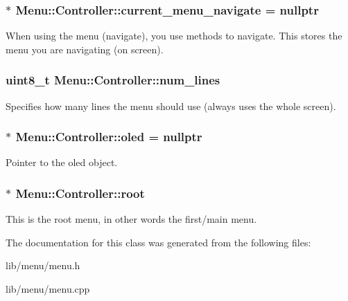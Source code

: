 \subsubsection[{\texorpdfstring{current\+\_\+menu\+\_\+navigate}{current_menu_navigate}}]{$\ast$ Menu\+::\+Controller\+::current\+\_\+menu\+\_\+navigate = nullptr\hspace{0.3cm}{\ttfamily [private]}}\hypertarget{class_menu_1_1_controller_a66ffabf19a4423ccca536762f0b9df88}{}\label{class_menu_1_1_controller_a66ffabf19a4423ccca536762f0b9df88}
When using the menu (navigate), you use methods to navigate. This stores the menu you are navigating (on screen). 
\subsubsection[{\texorpdfstring{num\+\_\+lines}{num_lines}}]{\setlength{\rightskip}{0pt plus 5cm}uint8\+\_\+t Menu\+::\+Controller\+::num\+\_\+lines\hspace{0.3cm}{\ttfamily [private]}}\hypertarget{class_menu_1_1_controller_a80d614a66d1ffa2612688776842f1f31}{}\label{class_menu_1_1_controller_a80d614a66d1ffa2612688776842f1f31}
Specifies how many lines the menu should use (always uses the whole screen). 
\subsubsection[{\texorpdfstring{oled}{oled}}]{$\ast$ Menu\+::\+Controller\+::oled = nullptr\hspace{0.3cm}{\ttfamily [private]}}\hypertarget{class_menu_1_1_controller_aaa0388123d9e3bb0d4f546336e2b502d}{}\label{class_menu_1_1_controller_aaa0388123d9e3bb0d4f546336e2b502d}
Pointer to the oled object. 
\subsubsection[{\texorpdfstring{root}{root}}]{$\ast$ Menu\+::\+Controller\+::root\hspace{0.3cm}{\ttfamily [private]}}\hypertarget{class_menu_1_1_controller_a211b6de05f7eed25f3a7f504c42316e0}{}\label{class_menu_1_1_controller_a211b6de05f7eed25f3a7f504c42316e0}
This is the root menu, in other words the first/main menu. 

The documentation for this class was generated from the following files\+:\begin{DoxyCompactItemize}
\item 
lib/menu/menu.\+h\item 
lib/menu/menu.\+cpp\end{DoxyCompactItemize}
